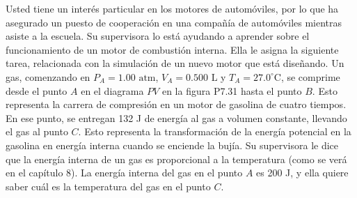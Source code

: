 \item Usted tiene un interés particular en los motores de automóviles, por lo que ha asegurado un puesto de cooperación en una compañía de automóviles mientras asiste a la escuela. Su supervisora lo está ayudando a aprender sobre el funcionamiento de un motor de combustión interna. Ella le asigna la siguiente tarea, relacionada con la simulación de un nuevo motor que está diseñando. Un gas, comenzando en $P_A = 1.00\text{ atm}$, $V_A = 0.500\text{ L}$ y $T_A = 27.0^\circ\text{C}$, se comprime desde el punto $A$ en el diagrama $PV$ en la figura P7.31 hasta el punto $B$. Esto representa la carrera de compresión en un motor de gasolina de cuatro tiempos. En ese punto, se entregan 132 J de energía al gas a volumen constante, llevando el gas al punto $C$. Esto representa la transformación de la energía potencial en la gasolina en energía interna cuando se enciende la bujía. Su supervisora le dice que la energía interna de un gas es proporcional a la temperatura (como se verá en el capítulo 8). La energía interna del gas en el punto $A$ es 200 J, y ella quiere saber cuál es la temperatura del gas en el punto $C$.
